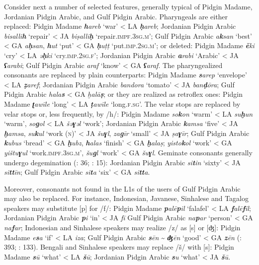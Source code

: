 \documentclass[output=paper]{langsci/langscibook}
\begin{document}
Consider next a number of selected features, generally typical of Pidgin Madame, Jordanian Pidgin Arabic, and Gulf Pidgin Arabic.  Pharyngeals are either replaced: Pidgin Madame \textit{\textbf{h}areb} ‘war’ < LA \textit{\textbf{ḥ}areb}; Jordanian Pidgin Arabic \textit{bisalli\textbf{h}} ‘repair’ < JA \textit{biṣalli\textbf{ḥ}} ‘repair.\textsc{impf}.\textsc{3sg.m}’; Gulf Pidgin Arabic \textit{a\textbf{k}san} ‘best’ < GA \textit{a\textbf{ḥ}san}, \textit{\textbf{h}ut} ‘put’ < GA \textit{\textbf{ḥ}uṭṭ} ‘put.\textsc{imp.2sg.m}’; or deleted: Pidgin Madame \textit{\textbf{ē}ki} ‘cry’ < LA \textit{ə\textbf{ḥ}ki} ‘cry.\textsc{imp}.2\textsc{sg}.\textsc{f}’; Jordanian Pidgin Arabic \textit{\textbf{a}rabi} ‘Arabic’ < JA \textit{\textbf{ʕ}arabi}; Gulf Pidgin Arabic \textit{araf} ‘know’ < GA \textit{\textbf{ʕ}araf}. The pharyngealized consonants are replaced by plain counterparts:  Pidgin Madame \textit{\textbf{s}arep} ‘envelope’ < LA \textit{\textbf{ẓ}aref}; Jordanian Pidgin Arabic \textit{bandora} ‘tomato’ < JA \textit{ban\textbf{ḍ}ōra}; Gulf Pidgin Arabic \textit{hala\textbf{s}} < GA \textit{ḫalā\textbf{ṣ}}; or they are realized as retroflex ones: Pidgin Madame \textit{\textbf{ʈ}awīle} ‘long’ < LA \textit{\textbf{ṭ}awīle} ‘long.\textsc{f}.\textsc{sg}’. The velar stops are replaced by velar stops or, less frequently, by /h/: Pidgin Madame \textit{so\textbf{k}on} ‘warm’ < LA \textit{su\textbf{ḫ}un} ‘warm’, \textit{so\textbf{g}ol} < LA \textit{šə\textbf{ɣ}əl} ‘work’; Jordanian Pidgin Arabic \textit{\textbf{k}amsa} ‘five’ < JA \textit{\textbf{ḫ}amsa}, \textit{su\textbf{k}ul} ‘work (\textsc{n})’ < JA \textit{šu\textbf{ɣ}l}, \textit{za\textbf{g}īr} ‘small’ < JA \textit{ṣa\textbf{ɣ}īr}; Gulf Pidgin Arabic \textit{\textbf{k}ubus} ‘bread’ < GA \textit{\textbf{ḫ}ubz}, \textit{\textbf{h}alas} ‘finish’ < GA \textit{\textbf{ḫ}alaṣ}; \textit{yisto\textbf{k}ol} ‘work’ < GA \textit{yištu\textbf{ɣ}ul} ‘work.\textsc{impf.3sg.m}’, \textit{šu\textbf{g}l} ‘work’ < GA \textit{šu\textbf{ɣ}l}. Geminate consonants generally undergo degemination (\citealt{Næss2008}: 36; \citealt{Avram2014Pidgin}: 15): Jordanian Pidgin Arabic \textit{si\textbf{t}in} ‘sixty’ < JA \textit{si\textbf{tt}īn}; Gulf Pidgin Arabic \textit{si\textbf{t}a} ‘six’ < GA \textit{si\textbf{tt}a}.

  Moreover, consonants not found in the L1s of the users of Gulf Pidgin Arabic may also be replaced. For instance, Indonesian, Javanese, Sinhalese and Tagalog speakers may substitute [p] for /f/: Pidgin Madame \textit{\textbf{p}alē\textbf{p}il} ‘falafel’ < LA \textit{\textbf{f}alē\textbf{f}il}; Jordanian Pidgin Arabic \textit{\textbf{p}i} ‘in’ < JA \textit{fī} Gulf Pidgin Arabic \textit{na\textbf{p}ar} ‘person’ < GA \textit{na\textbf{f}ar}; Indonesian and Sinhalese speakers may realize /z/ as [s] or [ʤ]: Pidgin Madame \textit{e\textbf{s}a} ‘if’ < LA \textit{iza}; Gulf Pidgin Arabic \textit{\textbf{s}ēn} {\textasciitilde} \textit{\textbf{ʤ}ēn} ‘good’ < GA \textit{\textbf{z}ēn} (\citealt{Bizri2014}: 393; \citealt{Avram2017article}: 133). Bengali and Sinhalese speakers may replace /š/ with [s]: Pidgin Madame \textit{\textbf{s}ū} ‘what’ < LA \textit{\textbf{š}ū}; Jordanian Pidgin Arabic \textit{\textbf{s}u} ‘what’ < JA \textit{\textbf{š}ū}.
\end{document}
